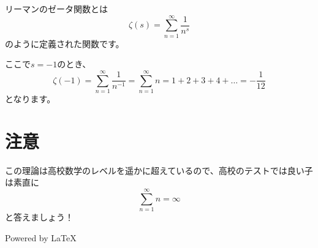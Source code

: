 \documentclass[a4paper,12pt,fleqn]{ltjsarticle}
\begin{document}
リーマンのゼータ関数とは
\begin{equation*}
    \zeta(s) = \sum_{n=1}^\infty \frac{1}{n^s}
\end{equation*}
のように定義された関数です。

ここで$s=-1$のとき、
\begin{equation*}
  \zeta(-1) = \sum_{n=1}^\infty \frac{1}{n^{-1}} = \sum_{n=1}^\infty n = 1+2+3+4+\dots = -\frac{1}{12}
\end{equation*}
となります。

\section{注意}
この理論は高校数学のレベルを遥かに超えているので、高校のテストでは良い子は素直に
\begin{equation*}
  \sum_{n=1}^\infty n = \infty
\end{equation*}
と答えましょう！

\vfill

\begin{flushright}
    Powered by \LaTeX
\end{flushright}
\end{document}
